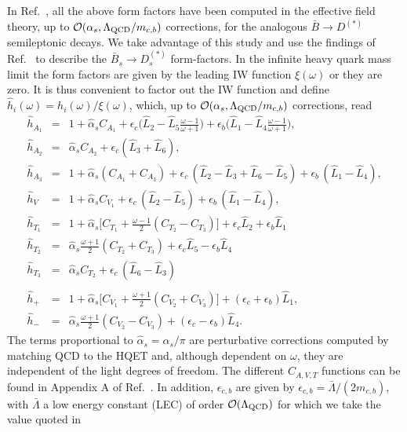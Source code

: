 \documentclass[aps,superscriptaddress,showpacs,nofootinbib,11pt]{revtex4-1}
\newcommand{\bea}{\begin{eqnarray}} \newcommand{\eea}{\end{eqnarray}}
\begin{document}
In Ref.~\cite{Bernlochner:2017jka}, all the  above form factors have been computed in the effective field theory, up to  ${\cal O}(\alpha_s,
\Lambda_{\rm QCD}/m_{c,b})$ corrections, for the analogous $\bar B\to D^{(*)}$ semileptonic decays. We take advantage of this study and  use the findings of Ref.~\cite{Bernlochner:2017jka} to describe the $\bar B_s\to D^{(*)}_s$ form-factors. In the infinite heavy quark 
mass limit the form factors are given by the leading IW function  $\xi(\omega)$ or they are zero. It is
 thus convenient to factor out the IW function and define  $\hat h_i(\omega)=h_i(\omega)/\xi(\omega)$, 
 which, up to ${\cal O}(\alpha_s,\Lambda_{\rm QCD}/m_{c,b})$ corrections, read~\cite{Bernlochner:2017jka}
%
\bea
\hat h_{A_1}&=&1+\hat\alpha_s C_{A_1}+\epsilon_c\Big(\hat L_2-\hat L_5\frac{\omega-1}{\omega+1}\Big)+\epsilon_b\Big(\hat L_1-\hat L_4\frac{\omega-1}{\omega+1}\Big),\nonumber\\
\hat h_{A_2}&=&\hat\alpha_s C_{A_2}+\epsilon_c(\hat L_3+\hat L_6),\nonumber\\
\hat h_{A_3}&=&1+\hat\alpha_s(C_{A_1}+C_{A_3})+\epsilon_c\, (\hat L_2-\hat L_3+\hat L_6-\hat L_5)+\epsilon_b\,(\hat L_1-\hat L_4),\nonumber\\
\hat h_V&=&1+\hat\alpha_s C_{V_1}+\epsilon_c\,(\hat L_2-\hat L_5)+\epsilon_b\,(\hat L_1-\hat L_4),
\nonumber\\
\hat h_{T_1}&=&1+\hat\alpha_s\Big[C_{T_1}+\frac{\omega-1}2(C_{T_2}-C_{T_3})\Big]+\epsilon_c\hat L_2+\epsilon_b\hat L_1\nonumber\\
\hat h_{T_2}&=&\hat\alpha_s\frac{\omega+1}2(C_{T_2}+C_{T_3})+\epsilon_c\hat L_5-\epsilon_b\hat L_4\nonumber\\
\hat h_{T_3}&=&\hat\alpha_sC_{T_2}+\epsilon_c\,(\hat L_6-\hat L_3)
\\\nonumber\\
\hat h_+&=&1+\hat\alpha_s\Big[
C_{V_1}+\frac{\omega+1}2(C_{V_2}+C_{V_3})\Big]+(\epsilon_c+\epsilon_b)\hat L_1,\nonumber\\
\hat h_-&=&\hat\alpha_s\frac{\omega+1}2(C_{V_2}-C_{V_3})+
(\epsilon_c-\epsilon_b)\hat L_4.
\eea
The terms proportional to $\hat\alpha_s=\alpha_s/\pi$ are perturbative corrections computed by matching QCD to the HQET and, although dependent on $\omega$, they are independent of the light degrees of freedom. The different $C_{A,V,T}$ functions can be found in Appendix A of Ref.~\cite{Bernlochner:2017jka}. 
%
In addition, $\epsilon_{c,b}$ are given by
$\epsilon_{c,b}=\bar\Lambda/(2m_{c,b})$, with $\bar\Lambda$ 
a low energy constant (LEC) of order ${\cal O}(\Lambda_{\rm QCD})$ for which we take the value  quoted in 
\end{document}
